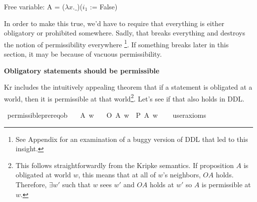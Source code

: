 \begin{isabellebody}
{  Free variable:
    A = ($\lambda x. \_$)($i_1$ := False) \color{black}%
}%
\endisatagproof
{\isafoldproof}%
%
\isadelimproof
%
\endisadelimproof
%
\begin{isamarkuptext}%
In order to make this true, we'd have to require that everything is either obligatory or
prohibited somewhere. Sadly, that breaks everything and destroys the 
notion of permissibility everywhere \footnote{See Appendix for an examination of a buggy version of DDL that led to this insight.}. 
If something breaks later in this section, it may be because of vacuous permissibility.%
\end{isamarkuptext}\isamarkuptrue%
%
\begin{isamarkuptext}%
\textbf{Obligatory statements should be permissible}%
\end{isamarkuptext}\isamarkuptrue%
%
\begin{isamarkuptext}%
Kr includes the intuitively appealing theorem that if a statement is obligated at a world, then it 
is permissible at that world\footnote{This follows straightforwardly from the Kripke semantics. If proposition $A$ is 
obligated at world $w$, this means that at all of $w$'s neighbors, $O A$ holds. Therefore, 
$\exists w'$ such that $w$ sees $w'$ and $O A$ holds at $w'$ so $A$ is permissible at $w$.}. Let's see 
if that also holds in DDL.%
\end{isamarkuptext}\isamarkuptrue%
\isamarkupfalse%
\ permissible{\isacharunderscore}prereq{\isacharunderscore}ob{\isacharcolon}\isanewline
\ \ \ A\ w\isanewline
\ \ \ {\isachardoublequoteopen}O\ {\isacharbraceleft}A{\isacharbraceright}\ w\ {\isasymlongrightarrow}\ P\ {\isacharbraceleft}A{\isacharbraceright}\ w{\isachardoublequoteclose}\isanewline
\ \ \isamarkupfalse%
\ {\isacharbrackleft}user{\isacharunderscore}axioms{\isacharbrackright}%
\isadelimproof
\ %
\endisadelimproof
%
\isatagproof
{}\isamarkupfalse%
\isanewline
%
\end{isabellebody}

